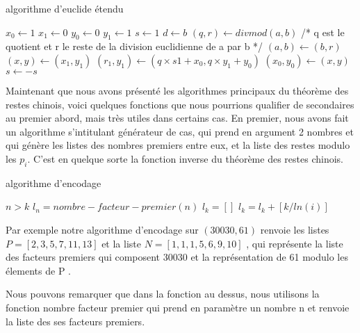 \documentclass[a4paper, 11pt]{report}
\begin{document}
\begin{algorithm}
    \caption{algorithme d'euclide étendu}
    \begin{algorithmic}
        \STATE $x_0 \leftarrow 1 $ 
        \STATE $x_1 \leftarrow 0 $
        \STATE $y_0 \leftarrow 0 $ 
        \STATE $y_1 \leftarrow 1 $ 
        \STATE $s \leftarrow 1 $ 
        \STATE $d \leftarrow b $
        \STATE $ (q,r) \leftarrow divmod(a,b) $  /* q est le quotient et r le reste de la division euclidienne de a par b */ 
        \STATE $ (a,b) \leftarrow (b,r) $ 
        \STATE $ (x,y) \leftarrow (x_1,y_1)$ 
        \STATE $ (r_1,y_1) \leftarrow (q\times s1 + x_0 , q\times y_1 + y_0) $
        \STATE $ (x_0,y_0) \leftarrow (x,y)$ 
        \STATE $ s \leftarrow -s$ 
        \ENDWHILE
    \end{algorithmic}

\end{algorithm}
\newpage

Maintenant que nous avons présenté les algorithmes principaux du théorème des restes chinois, voici quelques fonctions que nous pourrions qualifier de secondaires au premier abord, mais très utiles dans certains cas. \newline
En premier, nous avons fait un algorithme s'intitulant générateur de cas, qui prend en argument 2 nombres et qui génère les listes des nombres premiers entre eux, et la liste des restes modulo les $p_i$. C'est en
quelque sorte la fonction inverse du théorème des restes chinois. 

\begin{algorithm}
    \caption{algorithme d'encodage}
    \begin{algorithmic}
        \REQUIRE $n>k$
        \STATE $l_n= nombre-facteur-premier(n)$
        \STATE $l_k=[]$
        \STATE $l_k=l_k +[k/ln(i)]$
        \ENDFOR
    \end{algorithmic}

\end{algorithm}

Par exemple notre algorithme d'encodage sur $(30030,61)$ renvoie les listes $P=[2,3,5,7,11,13]$ et la liste $N=[1,1,1,5,6,9,10]$ ,
qui représente la liste des facteurs premiers qui composent 30030 et la représentation de 61 modulo les élements de P .  \newline

Nous pouvons remarquer que dans la fonction au dessus, nous utilisons la fonction nombre facteur premier qui prend en paramètre un nombre n et renvoie la liste des ses facteurs premiers. 
\end{document}

